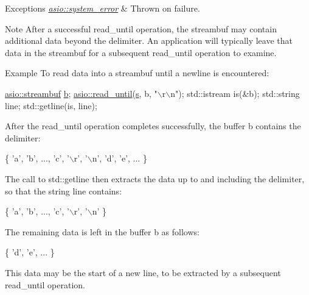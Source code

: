 \begin{DoxyExceptions}{Exceptions}
{\em \hyperlink{classasio_1_1system__error}{asio\+::system\+\_\+error}} & Thrown on failure.\\
\hline
\end{DoxyExceptions}
\begin{DoxyNote}{Note}
After a successful read\+\_\+until operation, the streambuf may contain additional data beyond the delimiter. An application will typically leave that data in the streambuf for a subsequent read\+\_\+until operation to examine.
\end{DoxyNote}
\begin{DoxyParagraph}{Example}
To read data into a streambuf until a newline is encountered\+: 
\begin{DoxyCode}
 \hyperlink{classasio_1_1basic__streambuf}{asio::streambuf} \hyperlink{group__async__read_ga945a5c18fa77a9e2eba420f8f44b2a4f}{b};
\hyperlink{group__read__until_ga1aae2baa82596a6a9ad320e80b016006}{asio::read\_until}(\hyperlink{group__async__connect_ga31ab74b9ea6c77932dddd016cfc7920a}{s}, b, \textcolor{stringliteral}{"\(\backslash\)r\(\backslash\)n"});
std::istream is(&b);
std::string line;
std::getline(is, line); 
\end{DoxyCode}
 After the {\ttfamily read\+\_\+until} operation completes successfully, the buffer {\ttfamily b} contains the delimiter\+: 
\begin{DoxyCode}
\{ \textcolor{charliteral}{'a'}, \textcolor{charliteral}{'b'}, ..., \textcolor{charliteral}{'c'}, \textcolor{charliteral}{'\(\backslash\)r'}, \textcolor{charliteral}{'\(\backslash\)n'}, \textcolor{charliteral}{'d'}, \textcolor{charliteral}{'e'}, ... \} 
\end{DoxyCode}
 The call to {\ttfamily std\+::getline} then extracts the data up to and including the delimiter, so that the string {\ttfamily line} contains\+: 
\begin{DoxyCode}
\{ \textcolor{charliteral}{'a'}, \textcolor{charliteral}{'b'}, ..., \textcolor{charliteral}{'c'}, \textcolor{charliteral}{'\(\backslash\)r'}, \textcolor{charliteral}{'\(\backslash\)n'} \} 
\end{DoxyCode}
 The remaining data is left in the buffer {\ttfamily b} as follows\+: 
\begin{DoxyCode}
\{ \textcolor{charliteral}{'d'}, \textcolor{charliteral}{'e'}, ... \} 
\end{DoxyCode}
 This data may be the start of a new line, to be extracted by a subsequent {\ttfamily read\+\_\+until} operation. 
\end{DoxyParagraph}


